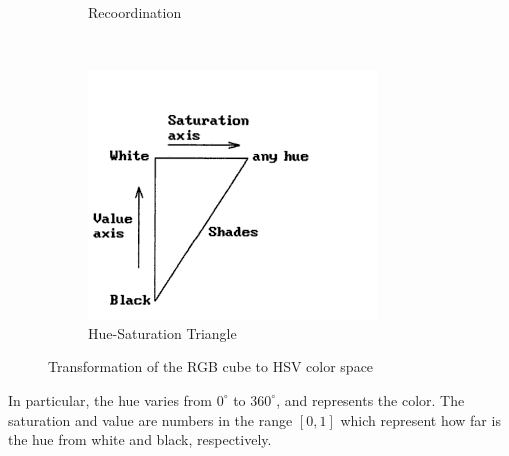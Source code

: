 \documentclass{report}
\begin{document}
\begin{figure}[hbtp]
\begin{subfigure}[b]{0.3\textwidth}
                \caption{Recoordination}
                \label{fig:mouse}
        \end{subfigure}
        ~
        \begin{subfigure}[b]{0.3\textwidth}
                \includegraphics[width=\textwidth]{graphics/hsv_rescale2.png}
                \caption{Hue-Saturation Triangle}
                \label{fig:tiger}
        \end{subfigure}
        \caption{Transformation of the RGB cube to HSV color space}\label{fig:hsv_visualisation}
\end{figure}

In particular, the hue varies from $0^{\circ}$ to $360^{\circ}$, and represents the color. The saturation and value are numbers in the range $[0,1]$ which represent how far is the hue from white and black, respectively. \\
\end{document}
